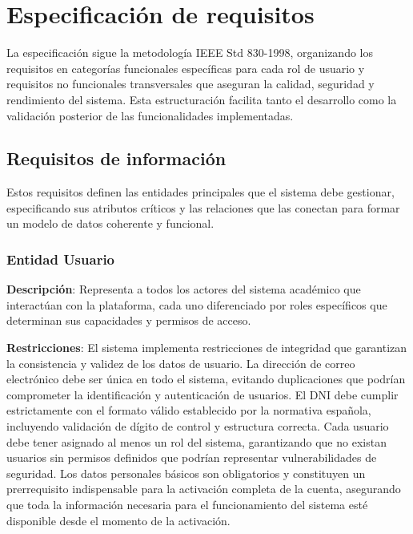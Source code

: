 \documentclass[12pt,a4paper,oneside]{report}
\begin{document}
\section{Especificación de
requisitos}\label{especificaciuxf3n-de-requisitos}

La especificación sigue la metodología IEEE Std 830-1998, organizando los requisitos en categorías funcionales específicas para cada rol de usuario y requisitos no funcionales transversales que aseguran la calidad, seguridad y rendimiento del sistema. Esta estructuración facilita tanto el desarrollo como la validación posterior de las funcionalidades implementadas.

\subsection{Requisitos de
información}\label{requisitos-de-informaciuxf3n}

Estos requisitos definen las entidades principales que el sistema debe gestionar, especificando sus atributos críticos y las relaciones que las conectan para formar un modelo de datos coherente y funcional.

\subsubsection{Entidad Usuario}\label{entidad-usuario}

\textbf{Descripción}: Representa a todos los actores del sistema académico que interactúan con la plataforma, cada uno diferenciado por roles específicos que determinan sus capacidades y permisos de acceso.

\textbf{Restricciones}: El sistema implementa restricciones de integridad que garantizan la consistencia y validez de los datos de usuario. La dirección de correo electrónico debe ser única en todo el sistema, evitando duplicaciones que podrían comprometer la identificación y autenticación de usuarios. El DNI debe cumplir estrictamente con el formato válido establecido por la normativa española, incluyendo validación de dígito de control y estructura correcta. Cada usuario debe tener asignado al menos un rol del sistema, garantizando que no existan usuarios sin permisos definidos que podrían representar vulnerabilidades de seguridad. Los datos personales básicos son obligatorios y constituyen un prerrequisito indispensable para la activación completa de la cuenta, asegurando que toda la información necesaria para el funcionamiento del sistema esté disponible desde el momento de la activación.
\end{document}
